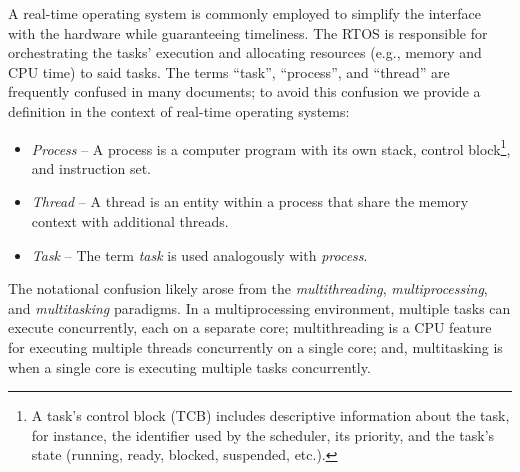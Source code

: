 A real-time operating system is commonly employed to simplify the interface with the hardware while guaranteeing timeliness.
The RTOS is responsible for orchestrating the tasks' execution and allocating resources (e.g., memory and CPU time) to said tasks.
The terms ``task'', ``process'', and ``thread'' are frequently confused in many documents; to avoid this confusion we provide a definition in the context of real-time operating systems:
%
\begin{itemize}
    \item \emph{Process} -- A process is a computer program with its own stack, control block\footnote{A task's control block (TCB) includes descriptive information about the task, for instance, the identifier used by the scheduler, its priority, and the task's state (running, ready, blocked, suspended, etc.).}, and instruction set.

    \item \emph{Thread} -- A thread is an entity within a process that share the memory context with additional threads.

    \item \emph{Task} -- The term \emph{task} is used analogously with \emph{process}.
\end{itemize}
%
The notational confusion likely arose from the \emph{multithreading}, \emph{multiprocessing}, and \emph{multitasking} paradigms.
In a multiprocessing environment, multiple tasks can execute concurrently, each on a separate core; multithreading is a CPU feature for executing multiple threads concurrently on a single core; and, multitasking is when a single core is executing multiple tasks concurrently.


